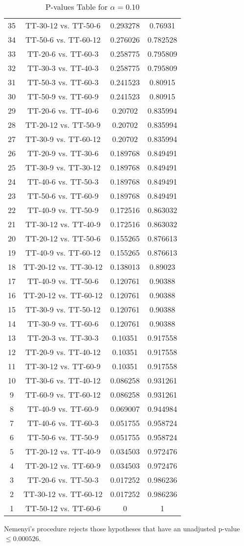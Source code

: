 \documentclass[a4paper,10pt]{article}
\begin{document}
\begin{landscape}
\begin{table}[!htp]
\begin{tabular}{cccc}
35&TT-30-12 vs. TT-50-6&0.293278&0.76931\\
34&TT-50-6 vs. TT-60-12&0.276026&0.782528\\
33&TT-20-6 vs. TT-60-3&0.258775&0.795809\\
32&TT-30-3 vs. TT-40-3&0.258775&0.795809\\
31&TT-50-3 vs. TT-60-3&0.241523&0.80915\\
30&TT-50-9 vs. TT-60-9&0.241523&0.80915\\
29&TT-20-6 vs. TT-40-6&0.20702&0.835994\\
28&TT-20-12 vs. TT-50-9&0.20702&0.835994\\
27&TT-30-9 vs. TT-60-12&0.20702&0.835994\\
26&TT-20-9 vs. TT-30-6&0.189768&0.849491\\
25&TT-30-9 vs. TT-30-12&0.189768&0.849491\\
24&TT-40-6 vs. TT-50-3&0.189768&0.849491\\
23&TT-50-6 vs. TT-60-9&0.189768&0.849491\\
22&TT-40-9 vs. TT-50-9&0.172516&0.863032\\
21&TT-30-12 vs. TT-40-9&0.172516&0.863032\\
20&TT-20-12 vs. TT-50-6&0.155265&0.876613\\
19&TT-40-9 vs. TT-60-12&0.155265&0.876613\\
18&TT-20-12 vs. TT-30-12&0.138013&0.89023\\
17&TT-40-9 vs. TT-50-6&0.120761&0.90388\\
16&TT-20-12 vs. TT-60-12&0.120761&0.90388\\
15&TT-30-9 vs. TT-50-12&0.120761&0.90388\\
14&TT-30-9 vs. TT-60-6&0.120761&0.90388\\
13&TT-20-3 vs. TT-30-3&0.10351&0.917558\\
12&TT-20-9 vs. TT-40-12&0.10351&0.917558\\
11&TT-30-12 vs. TT-60-9&0.10351&0.917558\\
10&TT-30-6 vs. TT-40-12&0.086258&0.931261\\
9&TT-60-9 vs. TT-60-12&0.086258&0.931261\\
8&TT-40-9 vs. TT-60-9&0.069007&0.944984\\
7&TT-40-6 vs. TT-60-3&0.051755&0.958724\\
6&TT-50-6 vs. TT-50-9&0.051755&0.958724\\
5&TT-20-12 vs. TT-40-9&0.034503&0.972476\\
4&TT-20-12 vs. TT-60-9&0.034503&0.972476\\
3&TT-20-6 vs. TT-50-3&0.017252&0.986236\\
2&TT-30-12 vs. TT-60-12&0.017252&0.986236\\
1&TT-50-12 vs. TT-60-6&0&1\\
\hline
\end{tabular}
\caption{P-values Table for $\alpha=0.10$}
\end{table}Nemenyi's procedure rejects those hypotheses that have an unadjusted p-value $\le0.000526$.


\end{landscape}
\end{document}
